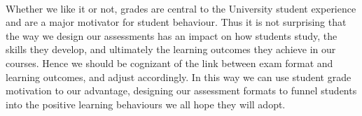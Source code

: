 \documentclass[12pt]{article}
\begin{document}
\paragraph{}
Whether we like it or not, grades are central to the University student experience and are a major motivator for student behaviour. Thus it is not surprising that the way we design our assessments has an impact on how students study, the skills they develop, and ultimately the learning outcomes they achieve in our courses. Hence we should be cognizant of the link between exam format and learning outcomes, and adjust accordingly. In this way we can use student grade motivation to our advantage, designing our assessment formats to funnel students into the positive learning behaviours we all hope they will adopt.
\newpage


\end{document}
